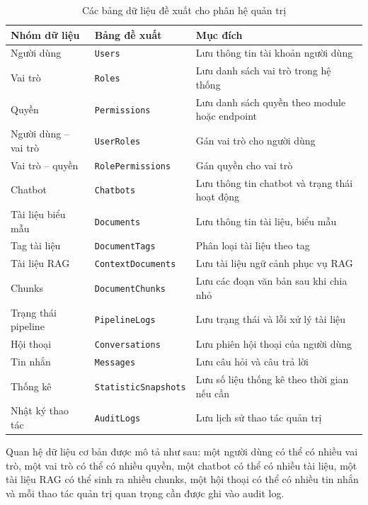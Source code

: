 \documentclass[12pt,a4paper]{report}
\begin{document}
\begin{table}[H]
\centering
\caption{Các bảng dữ liệu đề xuất cho phân hệ quản trị}
\label{tab:admin-db}
\begin{tabular}{|p{4cm}|p{5cm}|p{6cm}|}
\hline
\textbf{Nhóm dữ liệu} & \textbf{Bảng đề xuất} & \textbf{Mục đích} \\ \hline
Người dùng & \texttt{Users} & Lưu thông tin tài khoản người dùng \\ \hline
Vai trò & \texttt{Roles} & Lưu danh sách vai trò trong hệ thống \\ \hline
Quyền & \texttt{Permissions} & Lưu danh sách quyền theo module hoặc endpoint \\ \hline
Người dùng -- vai trò & \texttt{UserRoles} & Gán vai trò cho người dùng \\ \hline
Vai trò -- quyền & \texttt{RolePermissions} & Gán quyền cho vai trò \\ \hline
Chatbot & \texttt{Chatbots} & Lưu thông tin chatbot và trạng thái hoạt động \\ \hline
Tài liệu biểu mẫu & \texttt{Documents} & Lưu thông tin tài liệu, biểu mẫu \\ \hline
Tag tài liệu & \texttt{DocumentTags} & Phân loại tài liệu theo tag \\ \hline
Tài liệu RAG & \texttt{ContextDocuments} & Lưu tài liệu ngữ cảnh phục vụ RAG \\ \hline
Chunks & \texttt{DocumentChunks} & Lưu các đoạn văn bản sau khi chia nhỏ \\ \hline
Trạng thái pipeline & \texttt{PipelineLogs} & Lưu trạng thái và lỗi xử lý tài liệu \\ \hline
Hội thoại & \texttt{Conversations} & Lưu phiên hội thoại của người dùng \\ \hline
Tin nhắn & \texttt{Messages} & Lưu câu hỏi và câu trả lời \\ \hline
Thống kê & \texttt{StatisticSnapshots} & Lưu số liệu thống kê theo thời gian nếu cần \\ \hline
Nhật ký thao tác & \texttt{AuditLogs} & Lưu lịch sử thao tác quản trị \\ \hline
\end{tabular}
\end{table}

Quan hệ dữ liệu cơ bản được mô tả như sau: một người dùng có thể có nhiều vai trò, một vai trò có thể có nhiều quyền, một chatbot có thể có nhiều tài liệu, một tài liệu RAG có thể sinh ra nhiều chunks, một hội thoại có thể có nhiều tin nhắn và mỗi thao tác quản trị quan trọng cần được ghi vào audit log.
\end{document}
